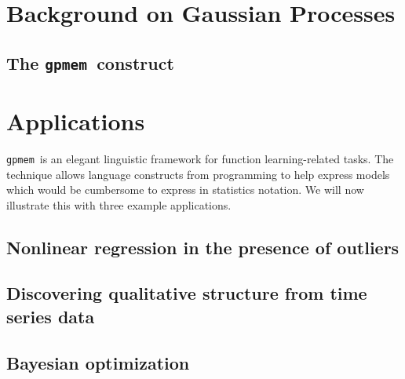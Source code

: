 \documentclass[twoside,11pt]{article}
\newcommand{\gpmem}{\texttt{gpmem}}
\begin{document}
\section{Background on Gaussian Processes}


%

\subsection{The \gpmem\ construct}


%


\section{Applications}
\gpmem\ is an elegant linguistic framework for function learning-related tasks.
The technique allows language constructs from programming to help express models
which would be cumbersome to express in statistics notation.
We will now illustrate this with three example applications. 

\subsection{Nonlinear regression in the presence of outliers}

%
\subsection{Discovering qualitative structure from time series data}\label{sec:structurelearning}


\subsection{Bayesian optimization}

\label{sec:thompson}
\end{document}
